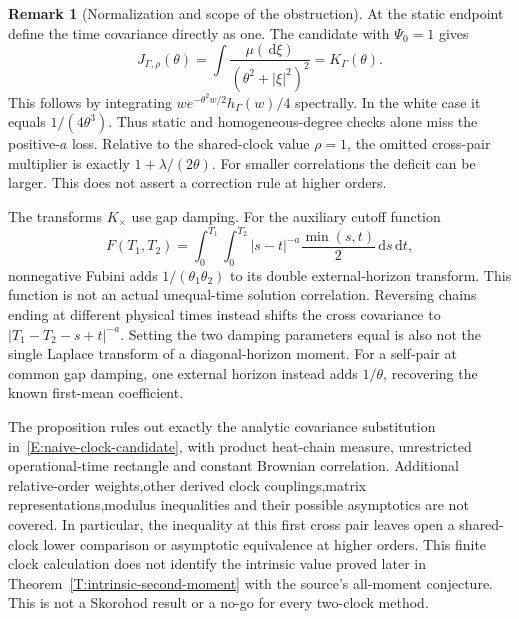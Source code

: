 \documentclass[12pt]{article}
\numberwithin{equation}{section}
\theoremstyle{definition}
\newtheorem{remark}[theorem]{Remark}
\newcommand{\ud}{\,\mathrm{d}}
\begin{document}
\begin{remark}[Normalization and scope of the obstruction]
  \label{R:clock-copy-scope}
  At the static endpoint define the time covariance directly as one.
  The candidate with \(\Psi_0=1\) gives
  \[
    J_{\Gamma,\rho}(\theta)
    =\int\frac{\mu(\ud\xi)}{(\theta^2+|\xi|^2)^2}
    =K_\Gamma(\theta).
  \]
  This follows by integrating \(w e^{-\theta^2w/2}h_\Gamma(w)/4\)
  spectrally. In the white case it equals \(1/(4\theta^3)\).
  Thus static and homogeneous-degree checks alone miss the positive-\(a\)
  loss. Relative to the shared-clock value \(\rho=1\), the omitted
  cross-pair multiplier is exactly \(1+\lambda/(2\theta)\).
  For smaller correlations the deficit can be larger.
  This does not assert a correction rule at
  higher orders.

  The transforms \(K_\times\) use gap damping. For the auxiliary cutoff
  function
  \[
    F(T_1,T_2)=\int_0^{T_1}\int_0^{T_2}
    |s-t|^{-a}\frac{\min(s,t)}2\ud s\ud t,
  \]
  nonnegative Fubini adds \(1/(\theta_1\theta_2)\) to its double
  external-horizon transform. This function is not an actual unequal-time
  solution correlation. Reversing chains ending at different physical
  times instead shifts the cross covariance to
  \(|T_1-T_2-s+t|^{-a}\).
  Setting the two damping parameters equal is also not the single
  Laplace transform of a diagonal-horizon moment.
  For a self-pair at common gap damping, one external horizon instead
  adds \(1/\theta\), recovering the known first-mean coefficient.

  The proposition rules out exactly the analytic covariance substitution
  in~\eqref{E:naive-clock-candidate}, with product heat-chain measure,
  unrestricted operational-time rectangle and constant Brownian correlation.
  Additional relative-order weights,other derived clock couplings,matrix
  representations,modulus inequalities and their possible asymptotics are
  not covered. In particular, the inequality at this first cross pair
  leaves open a shared-clock lower comparison or asymptotic equivalence
  at higher orders. This finite clock calculation does not identify the
  intrinsic value proved later in Theorem~\ref{T:intrinsic-second-moment}
  with the source's all-moment conjecture.
  This is not a Skorohod result or a no-go for every two-clock method.
\end{remark}
\end{document}
